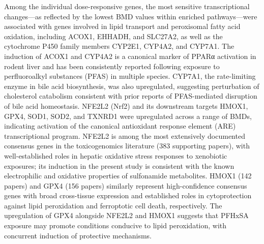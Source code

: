 Among the individual dose-responsive genes, the most sensitive transcriptional changes—as reflected by the lowest BMD values within enriched pathways—were associated with genes involved in lipid transport and peroxisomal fatty acid oxidation, including ACOX1, EHHADH, and SLC27A2, as well as the cytochrome P450 family members CYP2E1, CYP4A2, and CYP7A1. The induction of ACOX1 and CYP4A2 is a canonical marker of PPARα activation in rodent liver and has been consistently reported following exposure to perfluoroalkyl substances (PFAS) in multiple species. CYP7A1, the rate-limiting enzyme in bile acid biosynthesis, was also upregulated, suggesting perturbation of cholesterol catabolism consistent with prior reports of PFAS-mediated disruption of bile acid homeostasis. NFE2L2 (Nrf2) and its downstream targets HMOX1, GPX4, SOD1, SOD2, and TXNRD1 were upregulated across a range of BMDs, indicating activation of the canonical antioxidant response element (ARE) transcriptional program. NFE2L2 is among the most extensively documented consensus genes in the toxicogenomics literature (383 supporting papers), with well-established roles in hepatic oxidative stress responses to xenobiotic exposures; its induction in the present study is consistent with the known electrophilic and oxidative properties of sulfonamide metabolites. HMOX1 (142 papers) and GPX4 (156 papers) similarly represent high-confidence consensus genes with broad cross-tissue expression and established roles in cytoprotection against lipid peroxidation and ferroptotic cell death, respectively. The upregulation of GPX4 alongside NFE2L2 and HMOX1 suggests that PFHxSA exposure may promote conditions conducive to lipid peroxidation, with concurrent induction of protective mechanisms.

